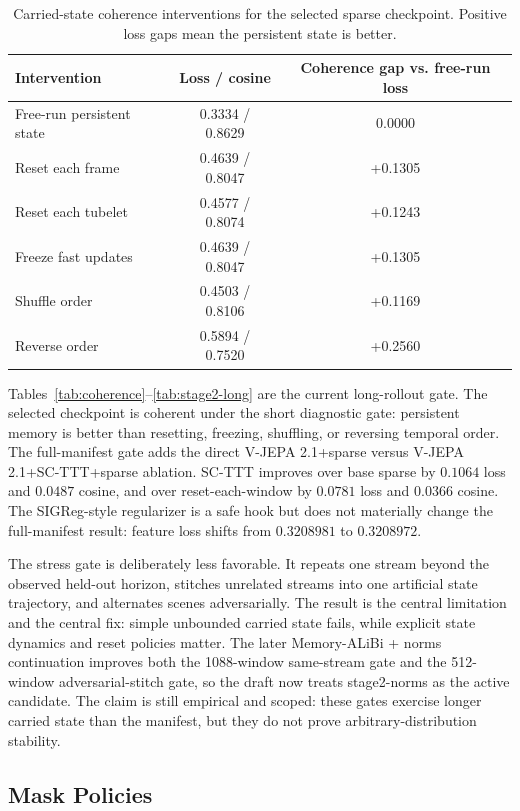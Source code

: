 \documentclass[10pt]{article}
\begin{document}
\begin{table}[t]
\centering
\caption{Carried-state coherence interventions for the selected sparse
checkpoint.  Positive loss gaps mean the persistent state is better.}
\label{tab:interventions}
\begin{tabular}{lcc}
\toprule
Intervention & Loss / cosine & Coherence gap vs. free-run loss \\
\midrule
Free-run persistent state & 0.3334 / 0.8629 & 0.0000 \\
Reset each frame & 0.4639 / 0.8047 & +0.1305 \\
Reset each tubelet & 0.4577 / 0.8074 & +0.1243 \\
Freeze fast updates & 0.4639 / 0.8047 & +0.1305 \\
Shuffle order & 0.4503 / 0.8106 & +0.1169 \\
Reverse order & 0.5894 / 0.7520 & +0.2560 \\
\bottomrule
\end{tabular}
\end{table}

Tables~\ref{tab:coherence}--\ref{tab:stage2-long} are the current long-rollout
gate.  The selected checkpoint is coherent under the short diagnostic gate:
persistent memory is better than resetting, freezing, shuffling, or reversing
temporal order.  The full-manifest gate adds the direct V-JEPA 2.1+sparse
versus V-JEPA 2.1+SC-TTT+sparse ablation.  SC-TTT improves over base sparse by
$0.1064$ loss and $0.0487$ cosine, and over reset-each-window by $0.0781$ loss
and $0.0366$ cosine.  The SIGReg-style regularizer is a safe hook but does not
materially change the full-manifest result: feature loss shifts from
$0.3208981$ to $0.3208972$.

The stress gate is deliberately less favorable.  It repeats one stream beyond
the observed held-out horizon, stitches unrelated streams into one artificial
state trajectory, and alternates scenes adversarially.  The result is the
central limitation and the central fix: simple unbounded carried state fails,
while explicit state dynamics and reset policies matter.  The later
Memory-ALiBi + norms continuation improves both the 1088-window same-stream
gate and the 512-window adversarial-stitch gate, so the draft now treats
stage2-norms as the active candidate.  The claim is still empirical and scoped:
these gates exercise longer carried state than the manifest, but they do not
prove arbitrary-distribution stability.

\subsection{Mask Policies}
\end{document}
